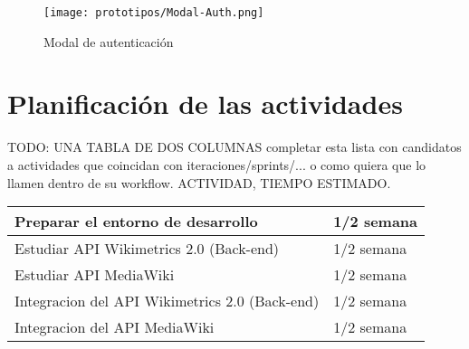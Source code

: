 \begin{figure}[H]
    \centering
    \texttt{[image: prototipos/Modal-Auth.png]}
    \caption{Modal de autenticación}
    \label{ModalAuth}
\end{figure}


\section{Planificación de las actividades}

TODO: UNA TABLA DE DOS COLUMNAS 
completar esta lista con candidatos a actividades que coincidan con iteraciones/sprints/... o como quiera que lo llamen dentro de su workflow.
ACTIVIDAD, TIEMPO ESTIMADO.

\begin{center}
\begin{tabular}{ | m{8cm} | m{5cm} | } 
 \hline
 Preparar el entorno de desarrollo & 1/2 semana \\ 
 \hline
 Estudiar API Wikimetrics 2.0 (Back-end) & 1/2 semana \\ 
 \hline
 Estudiar API MediaWiki & 1/2 semana \\ 
 \hline
 Integracion del API Wikimetrics 2.0 (Back-end) & 1/2 semana \\
 \hline
 Integracion del API MediaWiki & 1/2 semana \\
 \hline
\end{tabular}
\end{center}